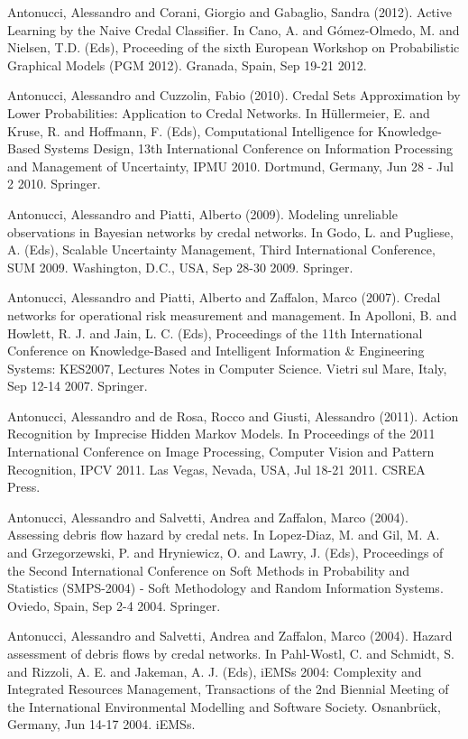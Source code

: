 \begin{cventries}
\begin{cvitems}
\item Antonucci, Alessandro and Corani, Giorgio and Gabaglio, Sandra (2012).   Active Learning by the Naive Credal Classifier.   In Cano, A. and Gómez-Olmedo, M. and Nielsen, T.D. (Eds), Proceeding of the sixth European Workshop on Probabilistic Graphical Models (PGM 2012).   Granada, Spain,   Sep 19-21 2012.
\item Antonucci, Alessandro and Cuzzolin, Fabio (2010).   Credal Sets Approximation by Lower Probabilities: Application to Credal Networks.   In Hüllermeier, E. and Kruse, R. and Hoffmann, F. (Eds), Computational Intelligence for Knowledge-Based Systems Design, 13th International Conference on Information Processing and Management of Uncertainty, IPMU 2010.   Dortmund, Germany,   Jun 28 - Jul 2 2010.   Springer.
\item Antonucci, Alessandro and Piatti, Alberto (2009).   Modeling unreliable observations in Bayesian networks by credal networks.   In Godo, L. and Pugliese, A. (Eds), Scalable Uncertainty Management, Third International Conference, SUM 2009.   Washington, D.C., USA,   Sep 28-30 2009.   Springer.
\item Antonucci, Alessandro and Piatti, Alberto and Zaffalon, Marco (2007).   Credal networks for operational risk measurement and management.   In Apolloni, B. and Howlett, R. J. and Jain, L. C. (Eds), Proceedings of the 11th International Conference on Knowledge-Based and Intelligent Information \& Engineering Systems: KES2007, Lectures Notes in Computer Science.   Vietri sul Mare, Italy,   Sep 12-14 2007.   Springer.
\item Antonucci, Alessandro and de Rosa, Rocco and Giusti, Alessandro (2011).   Action Recognition by Imprecise Hidden Markov Models.   In Proceedings of the 2011 International Conference on Image Processing, Computer Vision and Pattern Recognition, IPCV 2011.   Las Vegas, Nevada, USA,   Jul 18-21 2011.   CSREA Press.
\item Antonucci, Alessandro and Salvetti, Andrea and Zaffalon, Marco (2004).   Assessing debris flow hazard by credal nets.   In Lopez-Diaz, M. and Gil, M. A. and Grzegorzewski, P. and Hryniewicz, O. and Lawry, J. (Eds), Proceedings of the Second International Conference on Soft Methods in Probability and Statistics (SMPS-2004) - Soft Methodology and Random Information Systems.   Oviedo, Spain,   Sep 2-4 2004.   Springer.
\item Antonucci, Alessandro and Salvetti, Andrea and Zaffalon, Marco (2004).   Hazard assessment of debris flows by credal networks.   In Pahl-Wostl, C. and Schmidt, S. and Rizzoli, A. E. and Jakeman, A. J. (Eds), iEMSs 2004: Complexity and Integrated Resources Management, Transactions of the 2nd Biennial Meeting of the International Environmental Modelling and Software Society.   Osnanbrück, Germany,   Jun 14-17 2004.   iEMSs.

\end{cvitems}
\end{cventries}
